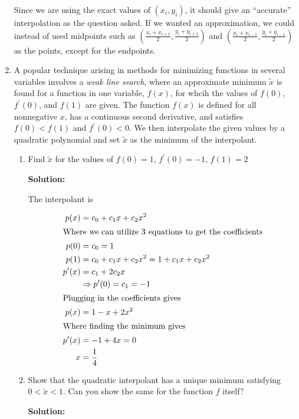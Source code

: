 \documentclass[12pt]{article}
\renewcommand{\P}[1]{\left( #1 \right)}
\begin{document}
\begin{enumerate}
Since we are using the exact values of $\P{x_{i}, y_{i}}$, it should give an ``accurate''
interpolation as the question asked. If we wanted an approximation, we could instead
of used midpoints such as $\P{\frac{x_{i} + x_{i+1}}{2}, \frac{y_{i} + y_{i+1}}{2}}$
and $\P{\frac{x_{i} + x_{i-1}}{2}, \frac{y_{i} + y_{i-1}}{2}}$ as the points, except
for the endpoints.


\item A popular technique arising in methods for minimizing functions in several
variables involves a {\em weak line search}, where an approximate minimum $\widetilde{x}$
is found for a function in one variable, $f(x)$, for whcih the values of $f(0)$,
$f^{\prime}(0)$, and $f(1)$ are given. The function $f(x)$ is defined for all
nonnegative $x$, has a continuous second derivative, and satisfies $f(0) < f(1)$
and $f^{\prime}(0) < 0$. We then interpolate the given values by a quadratic polynomial
and set $\widetilde{x}$ as the minimum of the interpolant.

\begin{enumerate}
  \item Find $\widetilde{x}$ for the values of $f(0) = 1$, $f^{\prime}(0) = -1$, $f(1) = 2$

  {\bf Solution:}

  The interpolant is

  \begin{align*}
    p(x) &= c_{0} + c_{1}x + c_{2}x^{2}\\
    \intertext{Where we can utilize 3 equations to get the coefficients}
    p(0) &= c_{0} = 1\\
    p(1) &= c_{0} + c_{1}x + c_{2}x^{2} = 1 + c_{1}x + c_{2}x^{2}\\
    p^{\prime}(x) &= c_{1} + 2c_{2}x\\
                  &\Rightarrow p^{\prime}(0) = c_{1} = -1\\
    \intertext{Plugging in the coefficients gives}
    p(x) &= 1 - x + 2x^{2}\\
    \intertext{Where finding the minimum gives}
    p^{\prime}(x) &= -1 + 4x = 0\\
    x &= \frac{1}{4}
  \end{align*}

  \item Show that the quadratic interpolant has a unique minimum satisfying $0 < \widetilde{x} < 1$.
  Can you show the same for the function $f$ itself?

  {\bf Solution:}


\end{enumerate}
\end{enumerate}
\end{document}

